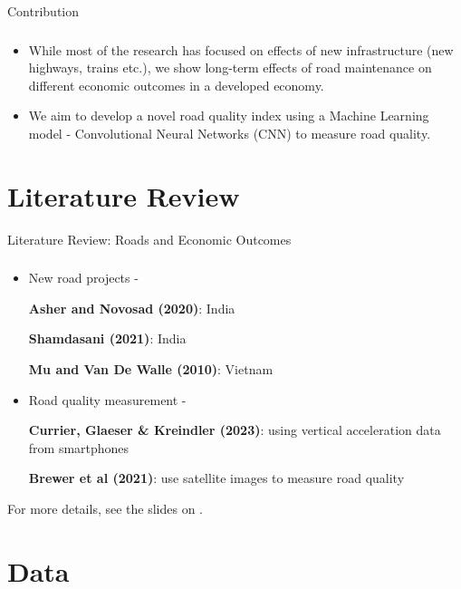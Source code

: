 \documentclass{beamer}
\begin{document}
\begin{frame}{Contribution}
\frametitle{}

\begin{itemize}
    \item While most of the research has focused on effects of new infrastructure (new highways, trains etc.), we show long-term effects of road maintenance on different economic outcomes in a developed economy.
    \item We aim to develop a novel road quality index using  a Machine Learning model - Convolutional Neural Networks (CNN) to measure road quality.
\end{itemize}

\end{frame}
        

\section{Literature Review}

\begin{frame}{Literature Review: Roads and Economic Outcomes}
\frametitle{}

\begin{itemize}
\label{main_lit}    
    \item New road projects - 

    {\small
    {\bf Asher and Novosad (2020)}: India
    
    {\bf Shamdasani (2021)}: India
    
    {\bf Mu and Van De Walle (2010)}: Vietnam    
    }
    
    \item Road quality measurement -

    {\small
    {\bf Currier, Glaeser \& Kreindler (2023)}: using vertical acceleration data from smartphones

    {\bf Brewer et al (2021)}: use satellite images to measure road quality

    }    
    
\end{itemize}

For more details, see the slides on \hyperlink{lit_background}{}.
\end{frame}

\section{Data}
\end{document}
